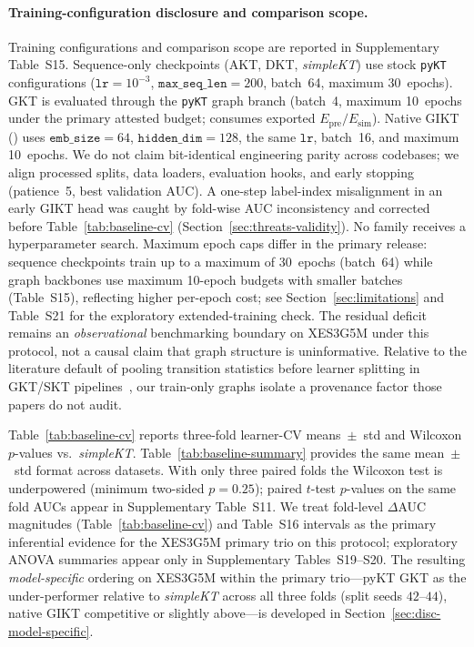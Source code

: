 \documentclass[pdflatex,sn-mathphys-num]{sn-jnl}
\newcommand{\Epre}{\ensuremath{E_{\text{pre}}}}
\newcommand{\Esim}{\ensuremath{E_{\text{sim}}}}
\begin{document}
\paragraph{Training-configuration disclosure and comparison scope.}
Training configurations and comparison scope are reported in
Supplementary Table~S15.
Sequence-only checkpoints (AKT, DKT, \textit{simpleKT}) use stock
\texttt{pyKT} configurations ($\texttt{lr}{=}10^{-3}$,
$\texttt{max\_seq\_len}{=}200$, batch~64, maximum 30~epochs). GKT is evaluated
through the \texttt{pyKT} graph branch (batch~4, maximum 10~epochs under the
primary attested budget; consumes exported $\Epre/\Esim$). Native GIKT
() uses $\texttt{emb\_size}{=}64$,
$\texttt{hidden\_dim}{=}128$, the same $\texttt{lr}$, batch~16, and
maximum 10~epochs. We do not claim bit-identical engineering parity across codebases;
we align processed splits, data loaders, evaluation hooks, and early stopping
(patience~5, best validation AUC). A one-step label-index misalignment in an
early GIKT head was caught by fold-wise AUC inconsistency and corrected before
Table~\ref{tab:baseline-cv} (Section~\ref{sec:threats-validity}). No family
receives a hyperparameter search. Maximum epoch caps differ in the primary release:
sequence checkpoints train up to a maximum of 30~epochs (batch~64) while graph backbones
use maximum 10-epoch budgets with smaller batches (Table~S15), reflecting higher
per-epoch cost; see Section~\ref{sec:limitations} and Table~S21 for the
exploratory extended-training check.
The residual deficit remains an \emph{observational} benchmarking boundary on
XES3G5M under this protocol, not a causal claim that graph structure is
uninformative. Relative to the literature default of pooling transition statistics before
learner splitting in GKT/SKT pipelines~\cite{nakagawa2019gkt,tong2020skt}, our
train-only graphs isolate a provenance factor those papers do not audit.


Table~\ref{tab:baseline-cv} reports three-fold learner-CV means~$\pm$~std and
Wilcoxon $p$-values vs.\ \textit{simpleKT}. Table~\ref{tab:baseline-summary}
provides the same mean~$\pm$~std format across datasets. With only three paired
folds the Wilcoxon test is underpowered (minimum two-sided $p{=}0.25$); paired
$t$-test $p$-values on the same fold AUCs appear in Supplementary Table~S11.
We treat fold-level $\Delta$AUC magnitudes (Table~\ref{tab:baseline-cv}) and
Table~S16 intervals as the primary inferential evidence for the XES3G5M primary
trio on this protocol; exploratory ANOVA summaries appear only in Supplementary
Tables~S19--S20. The resulting \emph{model-specific} ordering on XES3G5M within
the primary trio---pyKT GKT as the under-performer relative to
\textit{simpleKT} across all three folds (split seeds $42$--$44$), native GIKT competitive or
slightly above---is developed in Section~\ref{sec:disc-model-specific}.
\end{document}
